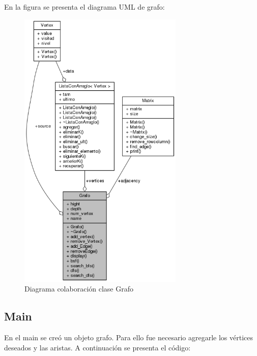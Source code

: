 \documentclass[11pt]{article}
\begin{document}
En la figura se presenta el diagrama UML de grafo:
\begin{figure}[h!]
\centering
\includegraphics[width=0.7\textwidth]{imagencita.png}
\caption{\label{fig:umlcalc} Diagrama colaboración clase Grafo}
\end{figure}


\subsection{Main}
En el main se creó un objeto grafo. Para ello fue necesario agregarle los vértices deseados y las aristas. A continuación se presenta el código:
\end{document}
